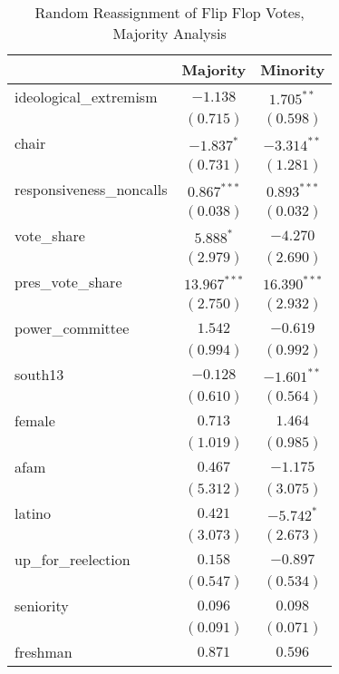 \documentclass[12pt]{article}
\begin{document}
\begin{table}
	\begin{center}
	\caption{Random Reassignment of Flip Flop Votes, Majority Analysis}
		\begin{tabular}{l c c }
			\hline
			& Majority & Minority \\
			\hline
			ideological\_extremism   & $-1.138$       & $1.705^{**}$   \\
			& $(0.715)$      & $(0.598)$      \\
			chair                    & $-1.837^{*}$   & $-3.314^{**}$  \\
			& $(0.731)$      & $(1.281)$      \\
			responsiveness\_noncalls & $0.867^{***}$  & $0.893^{***}$  \\
			& $(0.038)$      & $(0.032)$      \\
			vote\_share              & $5.888^{*}$    & $-4.270$       \\
			& $(2.979)$      & $(2.690)$      \\
			pres\_vote\_share        & $13.967^{***}$ & $16.390^{***}$ \\
			& $(2.750)$      & $(2.932)$      \\
			power\_committee         & $1.542$        & $-0.619$       \\
			& $(0.994)$      & $(0.992)$      \\
			south13                  & $-0.128$       & $-1.601^{**}$  \\
			& $(0.610)$      & $(0.564)$      \\
			female                   & $0.713$        & $1.464$        \\
			& $(1.019)$      & $(0.985)$      \\
			afam                     & $0.467$        & $-1.175$       \\
			& $(5.312)$      & $(3.075)$      \\
			latino                   & $0.421$        & $-5.742^{*}$   \\
			& $(3.073)$      & $(2.673)$      \\
			up\_for\_reelection      & $0.158$        & $-0.897$       \\
			& $(0.547)$      & $(0.534)$      \\
			seniority                & $0.096$        & $0.098$        \\
			& $(0.091)$      & $(0.071)$      \\
			freshman                 & $0.871$        & $0.596$        \\

\end{tabular}
\end{center}
\end{table}
\end{document}
